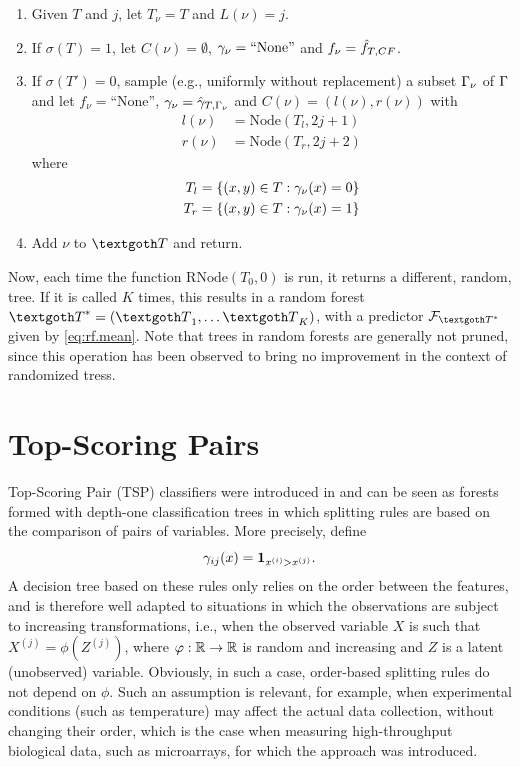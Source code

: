 \begin{algorithm}
\begin{enumerate}[label=(\alph*), wide = 0.5cm]
\item Given $T$ and $j$, let $T_\nu = T$ and $L(\nu) = j$.
\item If $\sigma(T) = 1$, let $C(\nu) = \emptyset$, $\gamma_\nu =\text{``None''}$ and $f_\nu = {\hat{f}}_{T, CF}$.
\item If $\sigma(T') = 0$, \alert{sample (e.g., uniformly without replacement) a subset $\Gamma_\nu$ of $\Gamma$} and let  $f_\nu =\text{``None''}$, $\gamma_\nu = \hat {\gamma}_{T,\Gamma_\nu}$ and $C(\nu) = (l(\nu), r(\nu))$ with 
\[
\begin{aligned}
l(\nu) &= \mathrm{Node}(T_l, 2j+1)\\
r(\nu) &= \mathrm{Node}(T_r, 2j+2)
\end{aligned}
\]
where 
\[
\begin{aligned}
T_l &= \{(x,y)\in T: \gamma_\nu(x) = 0\}\\
T_r &= \{(x,y)\in T: \gamma_\nu(x) = 1\}
\end{aligned}
\]
\item Add $\nu$ to $\CTR$ and return.
\end{enumerate}
\end{algorithm}

Now, each time the function $\mathrm{RNode}(T_0, 0)$ is run, it returns a different, random,  tree.
  If it is called $K$ times, this results in a random forest  $\CTR^* = (\CTR_1, \ldots \CTR_K)$, with a  predictor $\CF_{\CTR^*}$ given by \eqref{eq:rf.mean}.  Note that trees in random forests are generally not pruned, since this operation has been observed to bring no improvement in the context of randomized tress. 



\section{Top-Scoring Pairs}
Top-Scoring Pair (TSP) classifiers were introduced in \citet{geman2004classifying} and can be seen as forests formed with depth-one classification trees in which splitting rules are based on the comparison of pairs of variables. More precisely, define
\[
\gamma_{ij}(x) = {\bm 1}_{x^{(i)} > x^{(j)}}.
\]
A decision tree based on these rules only relies on the order between the features, and is therefore  well adapted to situations in which the observations are subject to  increasing transformations, i.e., when the observed variable $X$ is such that $X^{(j)} = \phi(Z^{(j)})$, where $\varphi: {\mathbb{R}}\to{\mathbb{R}}$ is random and increasing and $Z$ is a latent (unobserved) variable. Obviously, in such a case, order-based splitting rules do not depend on $\phi$. Such an assumption is relevant, for example, when experimental conditions (such as temperature) may affect the actual data collection, without changing their order, which is the case when measuring high-throughput biological data, such as microarrays, for which the approach was introduced.

